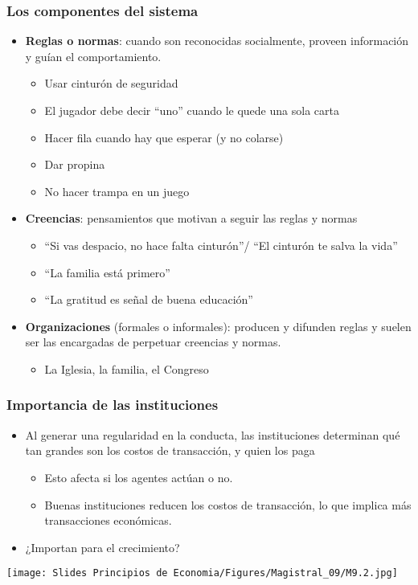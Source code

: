 \documentclass{beamer}
\begin{document}
\begin{frame}
\frametitle{Los componentes del sistema}
\begin{itemize}
    \item \textbf{Reglas o normas}: cuando son reconocidas socialmente, proveen información y guían el comportamiento.
        \begin{itemize}
        \item Usar cinturón de seguridad
        \item El jugador debe decir “uno” cuando le quede una sola carta 
        \item Hacer fila cuando hay que esperar (y no colarse) 
        \item Dar propina
        \item No hacer trampa en un juego
        \end{itemize}
    \item \textbf{Creencias}: pensamientos que motivan a seguir las reglas y normas
        \begin{itemize}
        \item “Si vas despacio, no hace falta cinturón”/ “El cinturón te salva la vida”
        \item “La familia está primero”
        \item  “La gratitud es señal de buena educación” \vspace{1mm}
        \end{itemize}
    \item \textbf{Organizaciones} (formales o informales): producen y difunden reglas y suelen ser las encargadas de perpetuar creencias y normas. 
        \begin{itemize}
        \item La Iglesia, la familia, el Congreso
        \end{itemize}
\end{itemize}
\end{frame}

\begin{frame}
\frametitle{Importancia de las instituciones}
\begin{itemize}
    \item Al generar una regularidad en la conducta, las instituciones determinan qué tan grandes son los costos de transacción, y quien los paga\vspace{1mm}
    \begin{itemize}
        \item Esto afecta si los agentes actúan o no.
        \item Buenas instituciones reducen los costos de transacción, lo que implica más transacciones económicas.\vspace{1mm}
    \end{itemize}
    \item ¿Importan para el crecimiento?
\end{itemize}
    \begin{center}
        \texttt{[image: Slides Principios de Economia/Figures/Magistral\_09/M9.2.jpg]}
    \end{center}
\end{frame}
\end{document}
